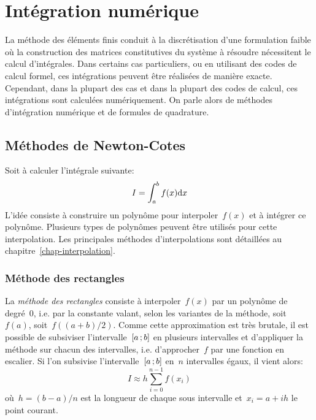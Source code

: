 \chapter{Intégration numérique}\label{chap-quadrature} 
La méthode des éléments finis conduit à la discrétisation d'une formulation faible où la construction des matrices constitutives du système à résoudre nécessitent le calcul d'intégrales. Dans certains cas particuliers, ou en utilisant des codes de calcul formel, ces intégrations peuvent être réalisées de manière exacte. Cependant, dans la plupart des cas et dans la plupart des codes de calcul, ces intégrations sont calculées numériquement. On parle alors de méthodes d'intégration numérique et de formules de quadrature. 
\section{Méthodes de Newton-Cotes}
Soit à calculer l'intégrale suivante: 
\begin{equation}
I=\int_a^b f(x)\text{d} x
\end{equation}
L'idée consiste à construire un polynôme pour interpoler~$f(x)$ et à intégrer ce polynôme. Plusieurs types de polynômes peuvent être utilisés pour cette interpolation. Les principales méthodes d'interpolations sont détaillées au chapitre~\ref{chap-interpolation}. 
\subsection{Méthode des rectangles}
La \emph{méthode des rectangles} consiste à interpoler~$f(x)$ par un polynôme de degré~$0$, i.e. par la constante valant, selon les variantes de la méthode, soit~$f(a)$, soit~$f((a+b)/2)$. Comme cette approximation est très brutale, il est possible de subsiviser l'intervalle~$\mathopen{[}a\,;b\mathclose{]}$ en plusieurs intervalles et d'appliquer la méthode sur chacun des intervalles, i.e. d'approcher~$f$ par une fonction en escalier. Si l'on subsivise l'intervalle~$\mathopen{[}a\,;b\mathclose{]}$ en~$n$ intervalles égaux, il vient alors: 
\begin{equation}
I\approx h\sum_{i=0}^{n-1} f(x_i)
\end{equation}
où~$h=(b-a)/n$ est la longueur de chaque sous intervalle et~$x_i=a+ih$ le point courant. 
